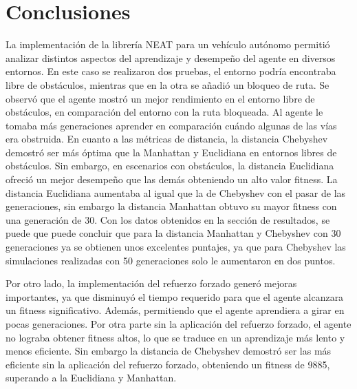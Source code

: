 \documentclass[conference]{IEEEtran}
\begin{document}
\section{Conclusiones}
La implementación de la librería NEAT para un vehículo autónomo permitió analizar distintos aspectos del aprendizaje y desempeño del agente en diversos entornos. En este caso se realizaron dos pruebas, el entorno podría encontraba libre de obstáculos, mientras que en la otra se añadió un bloqueo de ruta. Se observó que el agente mostró un mejor rendimiento en el entorno libre de obstáculos, en comparación del entorno con la ruta bloqueada. Al agente le tomaba más generaciones aprender en comparación cuándo algunas de las vías era obstruida. En cuanto a las métricas de distancia, la distancia Chebyshev demostró ser más óptima que la Manhattan y Euclidiana en entornos libres de obstáculos. Sin embargo, en escenarios con obstáculos, la distancia Euclidiana ofreció un mejor desempeño que las demás obteniendo un alto valor fitness. La distancia Euclidiana aumentaba al igual que la de Chebyshev con el pasar de las generaciones, sin embargo la distancia Manhattan obtuvo su mayor fitness con una generación de 30. Con los datos obtenidos en la sección de resultados, se puede que puede concluir que para la distancia Manhattan y Chebyshev con 30 generaciones ya se obtienen unos excelentes puntajes, ya que para Chebyshev las simulaciones realizadas con 50 generaciones solo le aumentaron en dos puntos. 

Por otro lado, la implementación del refuerzo forzado generó mejoras importantes, ya que disminuyó el tiempo requerido para que el agente alcanzara un fitness significativo. Además, permitiendo que el agente aprendiera a girar en pocas generaciones. Por otra parte sin la aplicación del refuerzo forzado, el agente no lograba obtener fitness altos, lo que se traduce en un aprendizaje más lento y menos eficiente. Sin embargo la distancia de Chebyshev demostró ser las más eficiente sin la aplicación del refuerzo forzado, obteniendo un fitness de 9885, superando a la Euclidiana y Manhattan. 
\printbibliography
\end{document}
